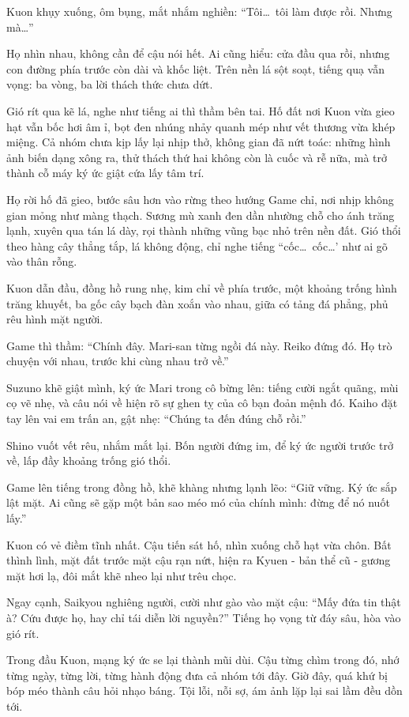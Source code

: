 \documentclass[../main.tex]{subfiles}
\begin{document}
Kuon khụy xuống, ôm bụng, mắt nhắm nghiền: ``Tôi\dots\ tôi làm được rồi. Nhưng mà\dots''

Họ nhìn nhau, không cần để cậu nói hết. Ai cũng hiểu: cửa đầu qua rồi, nhưng con đường phía trước còn dài và khốc liệt. Trên nền lá sột soạt, tiếng quạ vẫn vọng: ba vòng, ba lời thách thức chưa dứt.

Gió rít qua kẽ lá, nghe như tiếng ai thì thầm bên tai. Hố đất nơi Kuon vừa gieo hạt vẫn bốc hơi âm ỉ, bọt đen nhúng nhảy quanh mép như vết thương vừa khép miệng. Cả nhóm chưa kịp lấy lại nhịp thở, không gian đã nứt toác: những hình ảnh biến dạng xông ra, thử thách thứ hai không còn là cuốc và rễ nữa, mà trở thành cỗ máy ký ức giật cứa lấy tâm trí.

Họ rời hố đã gieo, bước sâu hơn vào rừng theo hướng Game chỉ, nơi nhịp không gian mỏng như màng thạch. Sương mù xanh đen dần nhường chỗ cho ánh trăng lạnh, xuyên qua tán lá dày, rọi thành những vũng bạc nhỏ trên nền đất. Gió thổi theo hàng cây thẳng tắp, lá không động, chỉ nghe tiếng ``cốc\dots\ cốc\dots' như ai gõ vào thân rỗng.

Kuon dẫn đầu, đồng hồ rung nhẹ, kim chỉ về phía trước, một khoảng trống hình trăng khuyết, ba gốc cây bạch đàn xoắn vào nhau, giữa có tảng đá phẳng, phủ rêu hình mặt người.

Game thì thầm: ``Chính đây. Mari-san từng ngồi đá này. Reiko đứng đó. Họ trò chuyện với nhau, trước khi cùng nhau trở về.''

Suzuno khẽ giật mình, ký ức Mari trong cô bừng lên: tiếng cười ngắt quãng, mùi cọ vẽ nhẹ, và câu nói về hiện rõ sự ghen tỵ của cô bạn đoản mệnh đó. Kaiho đặt tay lên vai em trấn an, gật nhẹ: ``Chúng ta đến đúng chỗ rồi.''

Shino vuốt vết rêu, nhắm mắt lại. Bốn người đứng im, để ký ức người trước trở về, lấp đầy khoảng trống gió thổi.

Game lên tiếng trong đồng hồ, khẽ khàng nhưng lạnh lẽo: ``Giữ vững. Ký ức sắp lật mặt. Ai cũng sẽ gặp một bản sao méo mó của chính mình: đừng để nó nuốt lấy.''

Kuon có vẻ điềm tĩnh nhất. Cậu tiến sát hố, nhìn xuống chỗ hạt vừa chôn. Bất thình lình, mặt đất trước mặt cậu rạn nứt, hiện ra Kyuen - bản thể cũ - gương mặt hơi lạ, đôi mắt khẽ nheo lại như trêu chọc.

Ngay cạnh, Saikyou nghiêng người, cười như gào vào mặt cậu: ``Mấy đứa tin thật à? Cứu được họ, hay chỉ tái diễn lời nguyền?'' Tiếng họ vọng từ đáy sâu, hòa vào gió rít.

Trong đầu Kuon, mạng ký ức se lại thành mũi dùi. Cậu từng chìm trong đó, nhớ từng ngày, từng lời, từng hành động đưa cả nhóm tới đây. Giờ đây, quá khứ bị bóp méo thành câu hỏi nhạo báng. Tội lỗi, nỗi sợ, ám ảnh lặp lại sai lầm đều dồn tới.
\end{document}
